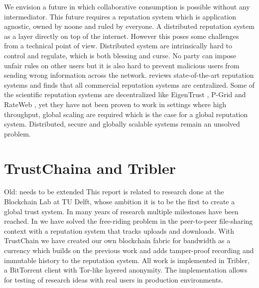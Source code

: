 We envision a future in which collaborative consumption is possible without any intermediator. This
future requires a reputation system which is application agnostic, owned by noone and ruled by 
everyone. A distributed reputation system as a layer directly
on top of the internet. However this poses some challenges from a technical
point of view. Distributed system are intrinsically hard to control and regulate, which is both 
blessing and curse. No party can impose unfair rules on other users but it is also hard to prevent 
malicious users from sending wrong information across the network. \cite{HENDRIKX2015184} reviews
state-of-the-art reputation systems and finds that all commercial reputation systems are centralized.
Some of the scientific reputation systems are decentralized like EigenTrust 
\cite{kamvar2003eigentrust}, P-Grid \cite{aberer2003p} and RateWeb \cite{malik2009rateweb}, yet
they have not been proven to work in settings where high throughput, global scaling are required 
which is the case for a global reputation system. Distributed, secure and globally scalable systems
remain an unsolved problem.


\section{TrustChaina and Tribler}
{\color{red} Old: needs to be extended}
This report is related to research done at the Blockchain Lab at TU Delft, whose ambition it is to 
be the first to create a global trust system. In many years of research multiple 
milestones have been reached. In \cite{meulpolder2009bartercast} we have solved the free-riding 
problem in the peer-to-peer file-sharing context with a reputation system that tracks uploads and 
downloads. With TrustChain \cite{OTTE2017} we have created our own blockchain fabric for bandwidth
as a currency which builds on the previous work and adds tamper-proof recording and immutable history
to the reputation system. All work is implemented in Tribler, a BitTorrent client with Tor-like 
layered anonymity. The implementation allows for testing of research ideas with real users in 
production environments. 


